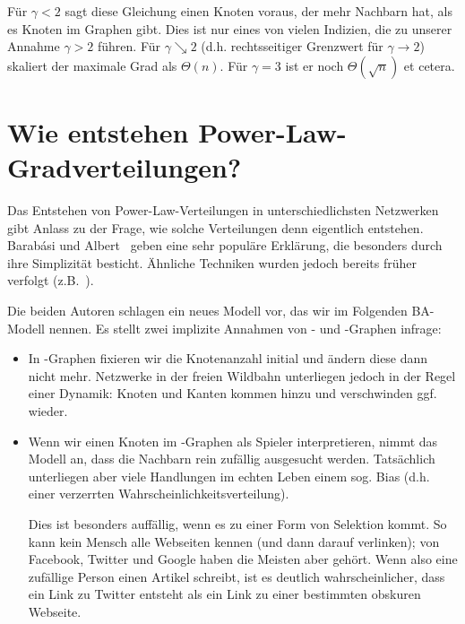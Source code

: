 Für $\gamma  < 2$ sagt diese Gleichung einen Knoten voraus, der mehr Nachbarn hat, als es Knoten im Graphen gibt.
Dies ist nur eines von vielen Indizien, die zu unserer Annahme $\gamma > 2$ führen.
Für $\gamma \searrow 2$ (d.h. rechtsseitiger Grenzwert für $\gamma \to 2$) skaliert der maximale Grad als $\Theta(n)$.
Für $\gamma = 3$ ist er noch $\Theta(\sqrt{n})$ et cetera.

\section{Wie entstehen Power-Law-Gradverteilungen?}
Das Entstehen von Power-Law-Verteilungen in unterschiedlichsten Netzwerken gibt Anlass zu der Frage, wie solche Verteilungen denn eigentlich entstehen.
Barab{\'{a}}si und Albert~\cite{barabasi1999emergence} geben eine sehr populäre Erklärung, die besonders durch ihre Simplizität besticht.
Ähnliche Techniken wurden jedoch bereits früher verfolgt (z.B.~\cite{10.2307/1716232}).

Die beiden Autoren schlagen ein neues Modell vor, das wir im Folgenden BA-Modell nennen.
Es stellt zwei implizite Annahmen von \Gnp- und \Gnm-Graphen infrage:
\begin{itemize}
    \item
          In \Gnp-Graphen fixieren wir die Knotenanzahl initial und ändern diese dann nicht mehr.
          Netzwerke in der freien Wildbahn unterliegen jedoch in der Regel einer Dynamik:
          Knoten und Kanten kommen hinzu und verschwinden ggf. wieder.

    \item
          Wenn wir einen Knoten im \Gnp-Graphen als Spieler interpretieren, nimmt das Modell an, dass die Nachbarn rein zufällig ausgesucht werden.
          Tatsächlich unterliegen aber viele Handlungen im echten Leben einem sog. Bias (d.h. einer verzerrten Wahrscheinlichkeitsverteilung).

          Dies ist besonders auffällig, wenn es zu einer Form von Selektion kommt.
          So kann kein Mensch alle Webseiten kennen (und dann darauf verlinken); von Facebook, Twitter und Google haben die Meisten aber gehört.
          Wenn also eine zufällige Person einen Artikel schreibt, ist es deutlich wahrscheinlicher, dass ein Link zu Twitter entsteht als ein Link zu einer bestimmten obskuren Webseite.
\end{itemize}

